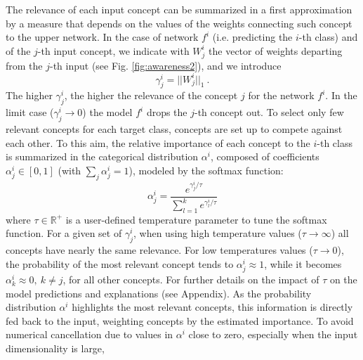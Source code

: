 The relevance of each input concept can be summarized in a first approximation by a measure that depends on the values of the weights connecting such concept to the upper network. In the case of network $f^i$ (i.e. predicting the $i$-th class) and of the $j$-th input concept, we indicate with $W_j^i$ the vector of weights departing from the $j$-th input (see Fig. \ref{fig:awareness2}), and we introduce
\begin{equation} \label{eq:gamma}
    \gamma^i_j = ||W^i_j||_1\ .
\end{equation}
The higher $\gamma^i_j$, the higher the relevance of the concept $j$ for the network $f^i$. In the limit case ($\gamma_j^i \rightarrow 0$) the model $f^i$ drops the $j$-th concept out.
To select only few relevant concepts for each target class, concepts are set up to compete against each other. To this aim, the relative importance of each concept to the $i$-th class is summarized in the categorical distribution 
$\alpha^{i}$, composed of coefficients
$\alpha^i_j \in [0,1]$ (with $\sum_j \alpha_j^i = 1$), modeled by the softmax function:
\begin{equation} \label{eq:alpha}
    \alpha^i_j = \frac{e^{\gamma^i_j/\tau}}{\sum_{l=1}^k e^{\gamma^i_l/\tau}}
\end{equation}
where $\tau \in \mathbb{R}^+$ is a user-defined temperature parameter to tune
the softmax function. For a given set of $\gamma^i_j$, when using high temperature values ($\tau \rightarrow \infty$) all concepts have nearly the same relevance. For low temperatures values ($\tau \rightarrow 0$), the probability of the most relevant concept tends to $\alpha_j^i\approx 1$, while it becomes $\alpha_k^i\approx 0, \ k \neq j$, for all other concepts. For further details on the impact of $\tau$ on the model predictions and explanations (see Appendix).
As the probability distribution $\alpha^i$ highlights the most relevant concepts, this information is directly fed back to the input, weighting concepts by the estimated importance. To avoid numerical cancellation due to values in $\alpha^i$ close to zero, especially when the input dimensionality is large,
